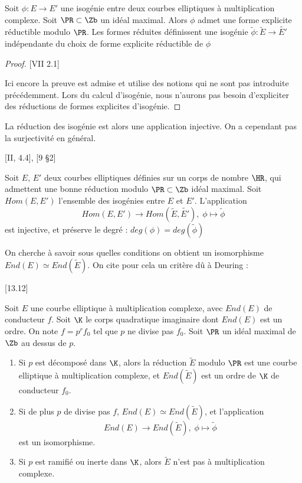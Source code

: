 \begin{Prop}
	Soit $\phi : E\rightarrow E'$ une isogénie entre deux courbes elliptiques à multiplication complexe. Soit $\PR\subset\Zb$ un idéal maximal. Alors $\phi$ admet une forme explicite réductible modulo $\PR$. Les formes réduites définissent une isogénie $\tilde{\phi} : \tilde{E}\rightarrow\tilde{E'}$ indépendante du choix de forme explicite réductible de $\phi$
\end{Prop}

\begin{proof}\cite{Sil94}[VII 2.1]
	
	Ici encore la preuve est admise et utilise des notions qui ne sont pas introduite précédemment. Lors du calcul d'isogénie, nous n'aurons pas besoin d'expliciter des réductions de formes explicites d'isogénie. 
\end{proof}

La réduction des isogénie est alors une application injective. On a cependant pas la surjectivité en général. 

\begin{Prop}\cite{Sil94}[II, 4.4], \cite{Lang1987}[9 \S2]
	
	Soit $E$, $E'$ deux courbes elliptiques définies sur un corps de nombre $\HR$, qui admettent une bonne réduction modulo $\PR\subset\Zb$ idéal maximal. Soit $Hom(E, E')$ l'ensemble des isogénies entre $E$ et $E'$. L'application 
	\begin{equation*}
		Hom(E, E')\rightarrow Hom(\tilde{E}, \tilde{E'}),\;\phi\mapsto\tilde{\phi}
	\end{equation*}
	est injective, et préserve le degré : $deg(\phi) = deg(\tilde{\phi})$
	
\end{Prop}

On cherche à savoir sous quelles conditions on obtient un isomorphisme $End(E)\simeq End(\tilde{E})$. On cite pour cela un critère dû à Deuring :

\begin{The}\cite{Lang1987}[13.12]
	
	Soit $E$ une courbe elliptique à multiplication complexe, avec $End(E)$ de conducteur $f$. Soit $\K$ le corps quadratique imaginaire dont $End(E)$ est un ordre. On note $f = p^r f_{0}$ tel que $p$ ne divise pas $f_{0}$. Soit $\PR$ un idéal maximal de $\Zb$ au dessus de $p$.
	\begin{enumerate}
		\item Si $p$ est décomposé dans $\K$, alors la réduction $\tilde{E}$ modulo $\PR$ est une courbe elliptique à multiplication complexe, et $End(\tilde{E})$ est un ordre de $\K$ de conducteur $f_{0}$.
		\item Si de plus $p$ de divise pas $f$, $End(E)\simeq End(\tilde{E})$, et l'application 
		\begin{equation*}
			End(E)\rightarrow End(\tilde{E}),\;\phi\mapsto\tilde{\phi}
		\end{equation*} est un isomorphisme.
		\item Si $p$ est ramifié ou inerte dans $\K$, alors $\tilde{E}$ n'est pas à multiplication complexe.
	\end{enumerate}
	
	
\end{The}



